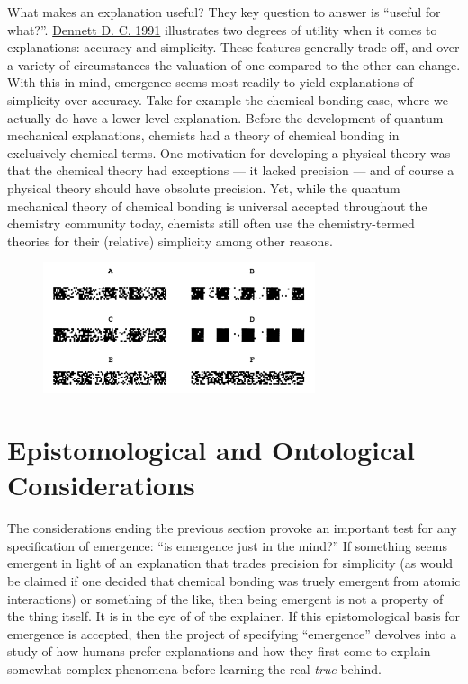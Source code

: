 \documentclass{article}
\newcommand{\ti}[1]{\textit{#1}}
\renewcommand{\cite}[1]{\hyperlink{#1}{#1}}
\begin{document}
What makes an explanation useful? They key question to answer is ``useful for what?''. \cite{Dennett D. C. 1991} illustrates two degrees of utility when it comes to explanations: accuracy and simplicity. These features generally trade-off, and over a variety of circumstances the valuation of one compared to the other can change. With this in mind, emergence seems most readily to yield explanations of simplicity over accuracy. Take for example the chemical bonding case, where we actually do have a lower-level explanation. Before the development of quantum mechanical explanations, chemists had a theory of chemical bonding in exclusively chemical terms. One motivation for developing a physical theory was that the chemical theory had exceptions --- it lacked precision --- and of course a physical theory should have obsolute precision. Yet, while the quantum mechanical theory of chemical bonding is universal accepted throughout the chemistry community today, chemists still often use the chemistry-termed theories for their (relative) simplicity among other reasons.

\begin{figure}[h]
\centering
\includegraphics[width=8cm]{barcode}
\end{figure}

\section{Epistomological and Ontological Considerations}


The considerations ending the previous section provoke an important test for any specification of emergence: ``is emergence just in the mind?'' If something seems emergent in light of an explanation that trades precision for simplicity (as would be claimed if one decided that chemical bonding was truely emergent from atomic interactions) or something of the like, then being emergent is not a property of the thing itself. It is in the eye of of the explainer. If this epistomological basis for emergence is accepted, then the project of specifying ``emergence'' devolves into a study of how humans prefer explanations and how they first come to explain somewhat complex phenomena before learning the real \ti{true} behind.
\end{document}
